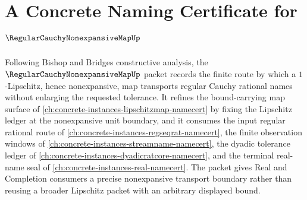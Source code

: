 \chapter{A Concrete Naming Certificate for $\RegularCauchyNonexpansiveMapUp$}
\label{ch:concrete-instances-regular-cauchy-nonexpansive-map-namecert}

Following Bishop and Bridges constructive analysis, the $\RegularCauchyNonexpansiveMapUp$ packet records the finite route by which a $1$-Lipschitz, hence nonexpansive, map transports regular Cauchy rational names without enlarging the requested tolerance. It refines the bound-carrying map surface of \autoref{ch:concrete-instances-lipschitzmap-namecert} by fixing the Lipschitz ledger at the nonexpansive unit boundary, and it consumes the input regular rational route of \autoref{ch:concrete-instances-regseqrat-namecert}, the finite observation windows of \autoref{ch:concrete-instances-streamname-namecert}, the dyadic tolerance ledger of \autoref{ch:concrete-instances-dyadicratcore-namecert}, and the terminal real-name seal of \autoref{ch:concrete-instances-real-namecert}. The packet gives Real and Completion consumers a precise nonexpansive transport boundary rather than reusing a broader Lipschitz packet with an arbitrary displayed bound.

